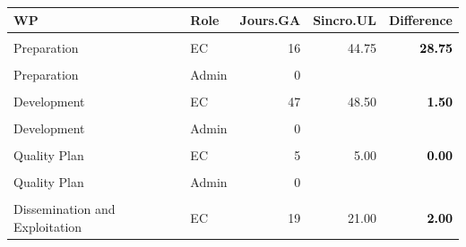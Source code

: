 \documentclass[
  a4paperpaper,
  onecolumn]{article}
\begin{document}
\begin{table}[H]
\centering
\begin{tabular}[t]{llrr|>{}r}
\toprule
WP & Role & Jours.GA & Sincro.UL & Difference\\
\midrule
\cellcolor{gray!6}{Preparation} & \cellcolor{gray!6}{Man} & \cellcolor{gray!6}{0} & \cellcolor{gray!6}{} & \textcolor{black}{\textbf{\cellcolor{gray!6}{}}}\\
\cmidrule{1-5}
Preparation & EC & 16 & 44.75 & \textcolor{black}{\textbf{28.75}}\\
\cmidrule{1-5}
\cellcolor{gray!6}{Preparation} & \cellcolor{gray!6}{Tech} & \cellcolor{gray!6}{9} & \cellcolor{gray!6}{9.50} & \textcolor{black}{\textbf{\cellcolor{gray!6}{0.50}}}\\
\cmidrule{1-5}
Preparation & Admin & 0 &  & \textcolor{black}{\textbf{}}\\
\cmidrule{1-5}
\cellcolor{gray!6}{Development} & \cellcolor{gray!6}{Man} & \cellcolor{gray!6}{6} & \cellcolor{gray!6}{6.00} & \textcolor{black}{\textbf{\cellcolor{gray!6}{0.00}}}\\
\cmidrule{1-5}
Development & EC & 47 & 48.50 & \textcolor{black}{\textbf{1.50}}\\
\cmidrule{1-5}
\cellcolor{gray!6}{Development} & \cellcolor{gray!6}{Tech} & \cellcolor{gray!6}{35} & \cellcolor{gray!6}{36.00} & \textcolor{black}{\textbf{\cellcolor{gray!6}{1.00}}}\\
\cmidrule{1-5}
Development & Admin & 0 &  & \textcolor{black}{\textbf{}}\\
\cmidrule{1-5}
\cellcolor{gray!6}{Quality Plan} & \cellcolor{gray!6}{Man} & \cellcolor{gray!6}{2} & \cellcolor{gray!6}{2.50} & \textcolor{black}{\textbf{\cellcolor{gray!6}{0.50}}}\\
\cmidrule{1-5}
Quality Plan & EC & 5 & 5.00 & \textcolor{black}{\textbf{0.00}}\\
\cmidrule{1-5}
\cellcolor{gray!6}{Quality Plan} & \cellcolor{gray!6}{Tech} & \cellcolor{gray!6}{0} & \cellcolor{gray!6}{} & \textcolor{black}{\textbf{\cellcolor{gray!6}{}}}\\
\cmidrule{1-5}
Quality Plan & Admin & 0 &  & \textcolor{black}{\textbf{}}\\
\cmidrule{1-5}
\cellcolor{gray!6}{Dissemination and Exploitation} & \cellcolor{gray!6}{Man} & \cellcolor{gray!6}{1} & \cellcolor{gray!6}{5.50} & \textcolor{black}{\textbf{\cellcolor{gray!6}{4.50}}}\\
\cmidrule{1-5}
Dissemination and Exploitation & EC & 19 & 21.00 & \textcolor{black}{\textbf{2.00}}\\

\end{tabular}
\end{table}
\end{document}
